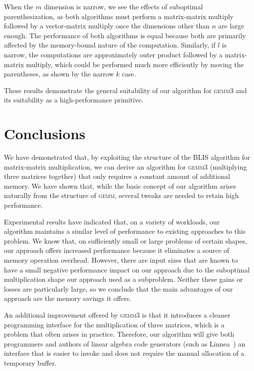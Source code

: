 \documentclass[12pt]{article}
\newcommand*{\gemmt}{{\textsc{gemm3}}}
\newcommand*{\gemm}{{\textsc{gemm}}}
\newcommand*{\mycite}[1]{~\cite{#1}}
\begin{document}
When the $m$ dimension is narrow, we see the effects of suboptimal parenthesization, as both algorithms must perform a matrix-matrix multiply followed by a vector-matrix multiply once the dimensions other than $n$ are large enough.
The performance of both algorithms is equal because both are primarily affected by the memory-bound nature of the computation.
Similarly, if $l$ is narrow, the computations are approximately outer product followed by a matrix-matrix multiply, which could be performed much more efficiently by moving the parentheses, as shown by the narrow $k$ case.

These results demonstrate the general suitability of our algorithm for \gemmt{} and its suitability as a high-performance primitive.

\section{Conclusions}
We have demonstrated that, by exploiting the structure of the BLIS algorithm for matrix-matrix multiplication, we can derive an algorithm for \gemmt{} (multiplying three matrices together) that only requires a constant amount of additional memory.
We have shown that, while the basic concept of our algorithm arises naturally from the structure of \gemm{}, several tweaks are needed to retain high performance.

Experimental results have indicated that, on a variety of workloads, our algorithm maintains a similar level of performance to existing approaches to this problem.
We know that, on sufficiently small or large problems of certain shapes, our approach offers increased performance because it eliminates a source of memory operation overhead.
However, there are input sizes that are known to have a small negative performance impact on our approach due to the suboptimal multiplication shape our approach used as a subproblem.
Neither these gains or losses are particularly large, so we conclude that the main advantages of our approach are the memory savings it offers.

An additional improvement offered by \gemmt{} is that it introduces a cleaner programming interface for the multiplication of three matrices, which is a problem that often arises in practice.
Therefore, our algorithm will give both programmers and authors of linear algebra code generators (such as Linnea\mycite{Barthels2017}) an interface that is easier to invoke and does not require the manual allocation of a temporary buffer.
\end{document}
